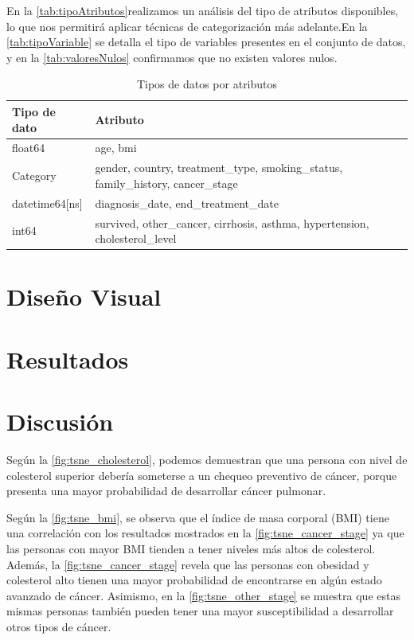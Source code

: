 \documentclass[10pt,journal,compsoc]{IEEEtran}
\begin{document}
En la \autoref{tab:tipoAtributos}realizamos un análisis del tipo de atributos disponibles, lo que nos permitirá aplicar técnicas de categorización más adelante.En la \autoref{tab:tipoVariable} se detalla el tipo de variables presentes en el conjunto de datos, y en la \autoref{tab:valoresNulos} confirmamos que no existen valores nulos.





\begin{table}[h!]
\centering
\begin{tabularx}{\columnwidth}{|l|X|}
\hline
\textbf{Tipo de dato}   & \textbf{Atributo}  \\ \hline
float64                 & age, bmi    \\ \hline
Category                & gender, country, treatment\_type, smoking\_status, family\_history, cancer\_stage  \\ \hline
datetime64[ns]          & diagnosis\_date, end\_treatment\_date   \\ \hline
int64                   & survived, other\_cancer, cirrhosis, asthma, hypertension, cholesterol\_level   \\ \hline
\end{tabularx}
\caption{Tipos de datos por atributos}
\label{tab:tipoAtributos}
\end{table}



\section{Diseño Visual}

\section{Resultados}

\section{Discusión}
Según la \autoref{fig:tsne_cholesterol}, podemos demuestran que una persona con nivel de colesterol superior debería someterse a un chequeo preventivo de cáncer, porque presenta una mayor probabilidad de desarrollar  cáncer pulmonar.

Según la \autoref{fig:tsne_bmi}, se observa que el índice de masa corporal (BMI) tiene una correlación con los resultados mostrados en la  \autoref{fig:tsne_cancer_stage} ya que las personas con mayor BMI tienden a tener niveles más altos de colesterol. Además, la  \autoref{fig:tsne_cancer_stage} revela que las personas con obesidad y colesterol alto tienen una mayor probabilidad de encontrarse en algún estado avanzado de cáncer. Asimismo, en la \autoref{fig:tsne_other_stage} se muestra que estas mismas personas también pueden tener una mayor susceptibilidad a desarrollar otros tipos de cáncer.
\end{document}

